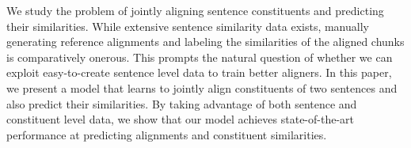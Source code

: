We study the problem of jointly aligning sentence constituents and predicting their similarities. While extensive sentence similarity data exists, manually generating reference alignments and labeling the similarities of the aligned chunks is comparatively onerous. This prompts the natural question of whether we can exploit easy-to-create sentence level data to train better aligners. In this paper, we present a model that learns to jointly align constituents of two sentences and also predict their similarities. By taking advantage of both sentence and constituent level data, we show that our model achieves state-of-the-art performance at predicting alignments and constituent similarities.

